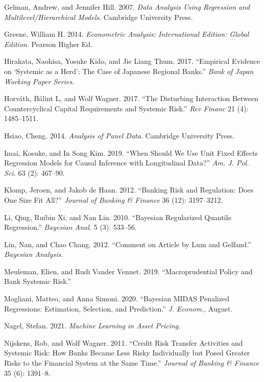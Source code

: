 \documentclass[
  10pt,
]{article}
\begin{document}
\leavevmode\hypertarget{ref-Gelman2007}{}%
Gelman, Andrew, and Jennifer Hill. 2007. \emph{Data Analysis Using
Regression and Multilevel/Hierarchical Models}. Cambridge University
Press.

\leavevmode\hypertarget{ref-Greene2014}{}%
Greene, William H. 2014. \emph{Econometric Analysis: International
Edition: Global Edition}. Pearson Higher Ed.

\leavevmode\hypertarget{ref-Hirakata2017}{}%
Hirakata, Naohisa, Yosuke Kido, and Jie Liang Thum. 2017. ``Empirical
Evidence on `Systemic as a Herd': The Case of Japanese Regional Banks.''
\emph{Bank of Japan Working Paper Series}.

\leavevmode\hypertarget{ref-Horvath2017}{}%
Horváth, Bálint L, and Wolf Wagner. 2017. ``The Disturbing Interaction
Between Countercyclical Capital Requirements and Systemic Risk.''
\emph{Rev Financ} 21 (4): 1485--1511.

\leavevmode\hypertarget{ref-Hsiao2014}{}%
Hsiao, Cheng. 2014. \emph{Analysis of Panel Data}. Cambridge University
Press.

\leavevmode\hypertarget{ref-Imai2019}{}%
Imai, Kosuke, and In Song Kim. 2019. ``When Should We Use Unit Fixed
Effects Regression Models for Causal Inference with Longitudinal Data?''
\emph{Am. J. Pol. Sci.} 63 (2): 467--90.

\leavevmode\hypertarget{ref-Klomp2012}{}%
Klomp, Jeroen, and Jakob de Haan. 2012. ``Banking Risk and Regulation:
Does One Size Fit All?'' \emph{Journal of Banking \& Finance} 36 (12):
3197--3212.

\leavevmode\hypertarget{ref-Li2010}{}%
Li, Qing, Ruibin Xi, and Nan Lin. 2010. ``Bayesian Regularized Quantile
Regression.'' \emph{Bayesian Anal.} 5 (3): 533--56.

\leavevmode\hypertarget{ref-Lin2012}{}%
Lin, Nan, and Chao Chang. 2012. ``Comment on Article by Lum and
Gelfand.'' \emph{Bayesian Analysis}.

\leavevmode\hypertarget{ref-Meuleman2019}{}%
Meuleman, Elien, and Rudi Vander Vennet. 2019. ``Macroprudential Policy
and Bank Systemic Risk.''

\leavevmode\hypertarget{ref-Mogliani2020}{}%
Mogliani, Matteo, and Anna Simoni. 2020. ``Bayesian MIDAS Penalized
Regressions: Estimation, Selection, and Prediction.'' \emph{J. Econom.},
August.

\leavevmode\hypertarget{ref-Nagel2021}{}%
Nagel, Stefan. 2021. \emph{Machine Learning in Asset Pricing}.

\leavevmode\hypertarget{ref-Nijskens2011}{}%
Nijskens, Rob, and Wolf Wagner. 2011. ``Credit Risk Transfer Activities
and Systemic Risk: How Banks Became Less Risky Individually but Posed
Greater Risks to the Financial System at the Same Time.'' \emph{Journal
of Banking \& Finance} 35 (6): 1391--8.
\end{document}
